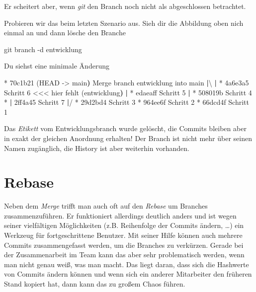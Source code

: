 \documentclass[
  letterpaper,
  DIV=11]{scrreprt}
\newenvironment{Shaded}{\begin{snugshade}}{\end{snugshade}}
\newcommand{\AttributeTok}[1]{\textcolor[rgb]{0.40,0.45,0.13}{#1}}
\newcommand{\ErrorTok}[1]{\textcolor[rgb]{0.68,0.00,0.00}{#1}}
\newcommand{\ExtensionTok}[1]{\textcolor[rgb]{0.00,0.23,0.31}{#1}}
\newcommand{\FunctionTok}[1]{\textcolor[rgb]{0.28,0.35,0.67}{#1}}
\newcommand{\KeywordTok}[1]{\textcolor[rgb]{0.00,0.23,0.31}{\textbf{#1}}}
\newcommand{\NormalTok}[1]{\textcolor[rgb]{0.00,0.23,0.31}{#1}}
\newcommand{\OperatorTok}[1]{\textcolor[rgb]{0.37,0.37,0.37}{#1}}
\newcommand{\StringTok}[1]{\textcolor[rgb]{0.13,0.47,0.30}{#1}}
\newcommand{\git}{\textit{git}\xspace}
\begin{document}
Er scheitert aber, wenn \git den Branch noch nicht als abgeschlossen
betrachtet.

Probieren wir das beim letzten Szenario aus. Sieh dir die Abbildung oben
nich einmal an und dann lösche den Branche

\begin{Shaded}
\begin{Highlighting}[]
\FunctionTok{git}\NormalTok{ branch }\AttributeTok{{-}d}\NormalTok{ entwicklung }
\end{Highlighting}
\end{Shaded}

Du siehst eine minimale Änderung

\begin{Shaded}
\begin{Highlighting}[]
\ExtensionTok{*}\NormalTok{   70c1b21 }\ErrorTok{(}\ExtensionTok{HEAD} \AttributeTok{{-}}\OperatorTok{\textgreater{}}\NormalTok{ main}\KeywordTok{)} \ExtensionTok{Merge}\NormalTok{ branch }\StringTok{\textquotesingle{}entwicklung\textquotesingle{}}\NormalTok{ into main}
\KeywordTok{|}\ExtensionTok{\textbackslash{} } 
\KeywordTok{|} \ExtensionTok{*}\NormalTok{ 4a6e3a5 Schritt 6   }\OperatorTok{\textless{}\textless{}\textless{}}\NormalTok{ hier fehlt }\ErrorTok{(}\ExtensionTok{entwicklung}\KeywordTok{)}
\KeywordTok{|} \ExtensionTok{*}\NormalTok{ edaeaff Schritt 5}
\KeywordTok{|} \ExtensionTok{*}\NormalTok{ 508019b Schritt 4}
\ExtensionTok{*} \KeywordTok{|} \ExtensionTok{2ff4a45}\NormalTok{ Schritt 7}
\KeywordTok{|}\ExtensionTok{/}  
\ExtensionTok{*}\NormalTok{ 29d2bd4 Schritt 3}
\ExtensionTok{*}\NormalTok{ 964ee6f Schritt 2}
\ExtensionTok{*}\NormalTok{ 66dcd4f Schritt 1}
\end{Highlighting}
\end{Shaded}

Das \emph{Etikett} vom Entwicklungsbranch wurde gelöscht, die Commits
bleiben aber in exakt der gleichen Anordnung erhalten! Der Branch ist
nicht mehr über seinen Namen zugänglich, die History ist aber weiterhin
vorhanden.

\section{Rebase}\label{rebase}

Neben dem \emph{Merge} trifft man auch oft auf den \emph{Rebase} um
Branches zusammenzuführen. Er funktioniert allerdings deutlich anders
und ist wegen seiner vielfältigen Möglichkeiten (z.B. Reihenfolge der
Commits ändern, \ldots) ein Werkzeug für fortgeschrittene Benutzer. Mit
seiner Hilfe können auch mehrere Commits zusammengefasst werden, um die
Branches zu verkürzen. Gerade bei der Zusammenarbeit im Team kann das
aber sehr problematisch werden, wenn man nicht genau weiß, was man
macht. Das liegt daran, dass sich die Hashwerte von Commits ändern
können und wenn sich ein anderer Mitarbeiter den früheren Stand kopiert
hat, dann kann das zu großem Chaos führen.
\end{document}
